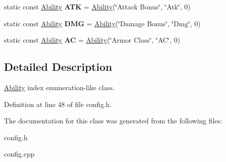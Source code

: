 \begin{DoxyCompactItemize}
\hypertarget{class_ability_ab9d60a63c58d4379a19ee5ce15245819}{}\label{class_ability_ab9d60a63c58d4379a19ee5ce15245819} 
static const \hyperlink{class_ability}{Ability} {\bfseries A\+TK} = \hyperlink{class_ability}{Ability}(\char`\"{}Attack Bonus\char`\"{}, \char`\"{}Atk\char`\"{}, 0)
\item 
\hypertarget{class_ability_ad9d1c22b1125b411391711c4cbcaa60a}{}\label{class_ability_ad9d1c22b1125b411391711c4cbcaa60a} 
static const \hyperlink{class_ability}{Ability} {\bfseries D\+MG} = \hyperlink{class_ability}{Ability}(\char`\"{}Damage Bonus\char`\"{}, \char`\"{}Dmg\char`\"{}, 0)
\item 
\hypertarget{class_ability_a5d000bfae7a21369d5bbd65074a2d20b}{}\label{class_ability_a5d000bfae7a21369d5bbd65074a2d20b} 
static const \hyperlink{class_ability}{Ability} {\bfseries AC} = \hyperlink{class_ability}{Ability}(\char`\"{}Armor Class\char`\"{}, \char`\"{}AC\char`\"{}, 0)
\end{DoxyCompactItemize}


\subsection{Detailed Description}
\hyperlink{class_ability}{Ability} index enumeration-\/like class. 

Definition at line 48 of file config.\+h.



The documentation for this class was generated from the following files\+:\begin{DoxyCompactItemize}
\item 
config.\+h\item 
config.\+cpp\end{DoxyCompactItemize}
